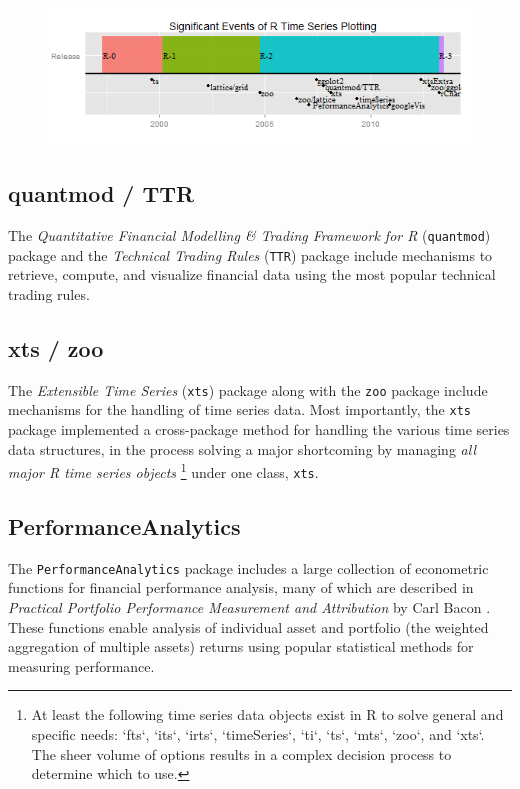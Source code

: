 \begin{figure}[htbp]
  \centering
  \includegraphics[width=14cm]{img/timeline}
\end{figure}

\subsection{quantmod / TTR}\label{quantmod-ttr}

The \emph{Quantitative Financial Modelling \& Trading Framework for R}
(\texttt{quantmod}) package and the \emph{Technical Trading Rules}
(\texttt{TTR}) package include mechanisms to retrieve, compute, and
visualize financial data using the most popular technical trading rules.

\subsection{xts / zoo}\label{xts-zoo}

The \emph{Extensible Time Series} (\texttt{xts}) package along with the
\texttt{zoo} package include mechanisms for the handling of time series
data. Most importantly, the \texttt{xts} package implemented a
cross-package method for handling the various time series data
structures, in the process solving a major shortcoming by managing
\emph{all major R time series objects}
\footnote{At least the following time series data objects exist in R to solve general and specific needs: `fts`, `its`, `irts`, `timeSeries`, `ti`, `ts`, `mts`, `zoo`, and `xts`. The sheer volume of options results in a complex decision process to determine which to use.}
under one class, \texttt{xts}.

\subsection{PerformanceAnalytics}\label{performanceanalytics}

The \texttt{PerformanceAnalytics} package includes a large collection of
econometric functions for financial performance analysis, many of which
are described in \emph{Practical Portfolio Performance Measurement and
Attribution} by Carl Bacon \citep{Bacon2004}. These functions enable
analysis of individual asset and portfolio (the weighted aggregation of
multiple assets) returns using popular statistical methods for measuring
performance.

